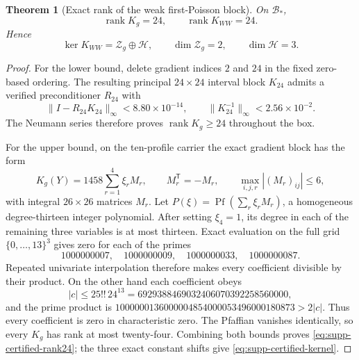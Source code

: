 \documentclass[11pt]{article}
\newtheorem{theorem}{Theorem}[section]
\numberwithin{equation}{section}
\theoremstyle{definition}
\theoremstyle{remark}
\newcommand{\rank}{\operatorname{rank}}
\begin{document}
\begin{theorem}[Exact rank of the weak first-Poisson block]
\label{thm:supp-certified-weak-rank}
On $\mathcal B_*$,
\begin{equation}
 \rank K_g=24,\qquad\rank K_{WW}=24.
 \label{eq:supp-certified-rank24}
\end{equation}
Hence
\begin{equation}
 \ker K_{WW}=\mathcal Z_g\oplus\mathcal H,
 \qquad \dim\mathcal Z_g=2,
 \qquad \dim\mathcal H=3.
 \label{eq:supp-certified-kernel}
\end{equation}
\end{theorem}
\begin{proof}
For the lower bound, delete gradient indices $2$ and $24$ in the fixed
zero-based ordering.  The resulting principal $24\times24$ interval block
$K_{24}$ admits a verified preconditioner $R_{24}$ with
\begin{equation}
 \|I-R_{24}K_{24}\|_\infty<8.80\times10^{-14},
 \qquad
 \|K_{24}^{-1}\|_\infty<2.56\times10^{-2}.
 \label{eq:supp-certified-K24}
\end{equation}
The Neumann series therefore proves $\rank K_g\ge24$ throughout the box.

For the upper bound, on the ten-profile carrier the exact gradient block has
the form
\begin{equation}
 K_g(Y)=1458\sum_{r=1}^4\xi_rM_r,
 \qquad M_r^{\mathsf T}=-M_r,
 \qquad \max_{i,j,r}|(M_r)_{ij}|\le6,
 \label{eq:supp-certified-pencil}
\end{equation}
with integral $26\times26$ matrices $M_r$.  Let
$P(\xi)=\operatorname{Pf}(\sum_r\xi_rM_r)$, a homogeneous degree-thirteen
integer polynomial.  After setting $\xi_4=1$, its degree in each of the
remaining three variables is at most thirteen.  Exact evaluation on the
full grid $\{0,\ldots,13\}^3$ gives zero for each of the primes
\begin{equation}
 1000000007,\quad1000000009,\quad1000000033,\quad1000000087.
 \label{eq:supp-certified-primes}
\end{equation}
Repeated univariate interpolation therefore makes every coefficient
divisible by their product.  On the other hand each coefficient obeys
\begin{equation}
 |c|\le25!!\,24^{13}
 =6929388469032406070392258560000,
 \label{eq:supp-certified-pf-bound}
\end{equation}
and the prime product is
$1000000136000004854000053496000180873>2|c|$.  Thus every coefficient is
zero in characteristic zero.  The Pfaffian vanishes identically, so every
$K_g$ has rank at most twenty-four.  Combining both bounds proves
\eqref{eq:supp-certified-rank24}; the three exact constant shifts give
\eqref{eq:supp-certified-kernel}.
\end{proof}
\end{document}

